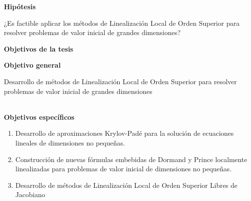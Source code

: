 \newpage

\begin{center}
	{\large \textbf{Hipótesis}}
\end{center}
¿Es factible aplicar los métodos de Linealización Local de Orden Superior para resolver problemas de valor inicial de grandes dimensiones?

\qquad

\begin{center}
	{\large \textbf{Objetivos de la tesis}}
\end{center}
\textbf{Objetivo general}

Desarrollo de métodos de Linealización Local de Orden Superior para resolver problemas de valor inicial de grandes dimensiones

\qquad\\
\textbf{Objetivos específicos}

\begin{enumerate}
	\item Desarrollo de aproximaciones Krylov-Padé para la solución de ecuaciones lineales de dimensiones no pequeñas.
	\item Construcción de nuevas fórmulas embebidas de Dormand y Prince localmente linealizadas para problemas de valor inicial de dimensiones no pequeñas.
	\item Desarrollo de métodos de Linealización Local de Orden Superior Libres de Jacobiano
\end{enumerate}
